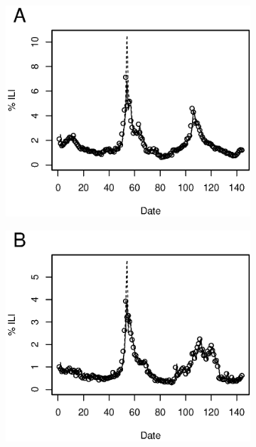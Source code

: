 \begin{figure}
\centering
\begin{subfigure}[b]{0.3\textwidth}
	\includegraphics[width=\textwidth]{longitude/figs/nowcastNational.eps}
\end{subfigure}
\begin{subfigure}[b]{0.3\textwidth}
	\includegraphics[width=\textwidth]{longitude/figs/nowcastHHSExample.eps}
\end{subfigure}
\begin{subfigure}[b]{0.3\textwidth}

\end{subfigure}
\end{figure}
